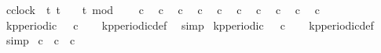 \begin{isabellebody}
\isamarkupfalse%
\ {\isacartoucheopen}c{}{\isacharcolon}{\isacharcolon}clock\ {\isasymequiv}\ {\isacharparenleft}{\isasymlambda}t{\isachardot}\ t\ {\isasymge}\ {}\ {\isasymand}\ {\isacharparenleft}t{\isacharminus}{}{\isacharparenright}\ mod\ {}\ {\isacharequal}\ {}{\isacharparenright}{\isacartoucheclose}\isanewline
\isanewline
{}\isamarkupfalse%
\ {\isacartoucheopen}c{}\ {}{\isacartoucheclose}\isanewline
{}\isamarkupfalse%
\ {\isacartoucheopen}c{}\ {}{\isacartoucheclose}\isanewline
{}\isamarkupfalse%
\ {\isacartoucheopen}c{}\ {}{\isacartoucheclose}\isanewline
{}\isamarkupfalse%
\ {\isacartoucheopen}c{}\ {}{\isacartoucheclose}\isanewline
\isanewline
{}\isamarkupfalse%
\ {\isacartoucheopen}c{}\ {}{\isacartoucheclose}\isanewline
{}\isamarkupfalse%
\ {\isacartoucheopen}c{}\ {}{\isacartoucheclose}\isanewline
{}\isamarkupfalse%
\ {\isacartoucheopen}c{}\ {}{\isacartoucheclose}\isanewline
{}\isamarkupfalse%
\ {\isacartoucheopen}c{}\ {}{\isacartoucheclose}\isanewline
{}\isamarkupfalse%
\ {\isacartoucheopen}c{}\ {}{\isacartoucheclose}\isanewline
{}\isamarkupfalse%
\ {\isacartoucheopen}c{}\ {}{\isacartoucheclose}\isanewline
\isanewline
{}\isamarkupfalse%
\ {\isacartoucheopen}kp{\isacharunderscore}periodic\ {}\ {}\ c{}{\isacartoucheclose}\isanewline
%
\isadelimproof
\ \ %
\endisadelimproof
%
\isatagproof
{}\isamarkupfalse%
\ kp{\isacharunderscore}periodic{\isacharunderscore}def\ \isamarkupfalse%
\ simp%
\endisatagproof
{\isafoldproof}%
%
\isadelimproof
\isanewline
%
\endisadelimproof
\isanewline
{}\isamarkupfalse%
\ {\isacartoucheopen}kp{\isacharunderscore}periodic\ {}\ {}\ c{}{\isacartoucheclose}\isanewline
%
\isadelimproof
\ \ %
\endisadelimproof
%
\isatagproof
{}\isamarkupfalse%
\ kp{\isacharunderscore}periodic{\isacharunderscore}def\ \isamarkupfalse%
\ simp%
\endisatagproof
{\isafoldproof}%
%
\isadelimproof
\isanewline
%
\endisadelimproof
\isanewline
{}\isamarkupfalse%
\ {\isacartoucheopen}c{}\ {\isasymequiv}\ c{}\ {\isasymoplus}\ c{}{\isacartoucheclose}\isanewline

\end{isabellebody}
